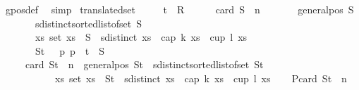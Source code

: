 \begin{isabellebody}
\ gpos{\isacharunderscore}{\kern0pt}def\ \isamarkupfalse%
\ simp\isanewline
{}\isamarkupfalse%
%
\endisatagproof
{\isafoldproof}%
%
\isadelimproof
\isanewline
%
\endisadelimproof
\isanewline
{}\isamarkupfalse%
\ translated{\isacharunderscore}{\kern0pt}set{\isacharcolon}{\kern0pt}\isanewline
\ \ \ \ \ t\ {\isacharcolon}{\kern0pt}{\isacharcolon}{\kern0pt}\ R{}\isanewline
\ \ \isanewline
\ \ \ {\isachardoublequoteopen}card\ S\ {\isacharequal}{\kern0pt}\ n{\isachardoublequoteclose}\isanewline
\ \ \ \ \ \ \ {\isachardoublequoteopen}general{\isacharunderscore}{\kern0pt}pos\ S{\isachardoublequoteclose}\isanewline
\ \ \ \ \ \ \ {\isachardoublequoteopen}sdistinct{\isacharparenleft}{\kern0pt}sorted{\isacharunderscore}{\kern0pt}list{\isacharunderscore}{\kern0pt}of{\isacharunderscore}{\kern0pt}set\ S{\isacharparenright}{\kern0pt}{\isachardoublequoteclose}\isanewline
\ \ \ \ \ \ \ {\isachardoublequoteopen}{\isasymforall}xs{\isachardot}{\kern0pt}\ set\ xs\ {\isasymsubseteq}\ S\ {\isasymand}\ sdistinct\ xs\ {\isasymlongrightarrow}\ {\isasymnot}{\isacharparenleft}{\kern0pt}cap\ k\ xs\ {\isasymor}\ cup\ l\ xs{\isacharparenright}{\kern0pt}{\isachardoublequoteclose}\ \isanewline
\ \ \ \ \ \ \ {\isachardoublequoteopen}St\ {\isacharequal}{\kern0pt}\ {\isacharparenleft}{\kern0pt}{\isasymlambda}\ p{\isachardot}{\kern0pt}\ p\ {\isacharplus}{\kern0pt}\ t{\isacharparenright}{\kern0pt}\ {\isacharbackquote}{\kern0pt}\ S{\isachardoublequoteclose}\ \ \ \isanewline
\ \ \ \ \isanewline
\ \ \ \ \ {\isachardoublequoteopen}card\ St\ {\isacharequal}{\kern0pt}\ n\ {\isasymand}\ general{\isacharunderscore}{\kern0pt}pos\ St\ {\isasymand}\ sdistinct{\isacharparenleft}{\kern0pt}sorted{\isacharunderscore}{\kern0pt}list{\isacharunderscore}{\kern0pt}of{\isacharunderscore}{\kern0pt}set\ St{\isacharparenright}{\kern0pt}\ {\isasymand}\isanewline
\ \ \ \ \ \ \ \ \ \ \ {\isacharparenleft}{\kern0pt}{\isasymforall}xs{\isachardot}{\kern0pt}\ set\ xs\ {\isasymsubseteq}\ St\ {\isasymand}\ sdistinct\ xs\ {\isasymlongrightarrow}\ {\isasymnot}{\isacharparenleft}{\kern0pt}cap\ k\ xs\ {\isasymor}\ cup\ l\ xs{\isacharparenright}{\kern0pt}{\isacharparenright}{\kern0pt}{\isachardoublequoteclose}\isanewline
%
\isadelimproof
%
\endisadelimproof
%
\isatagproof
{}\isamarkupfalse%
{\isacharminus}{\kern0pt}\isanewline
\ \ \isamarkupfalse%
\ P{}{\isacharcolon}{\kern0pt}{\isachardoublequoteopen}card\ St\ {\isacharequal}{\kern0pt}\ n{\isachardoublequoteclose}\ \isamarkupfalse%

\end{isabellebody}
